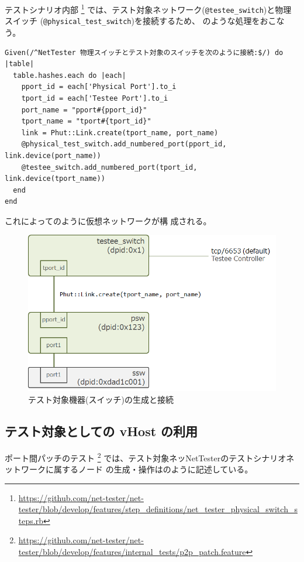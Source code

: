 テストシナリオ内部
\footnote{\url{https://github.com/net-tester/net-tester/blob/develop/features/step_definitions/net_tester_physical_switch_steps.rb}}
では、テスト対象ネットワーク(\verb|@testee_switch|)と物理スイッチ
(\verb|@physical_test_switch|)を接続するため、
のような処理をおこなう。

\begin{lstlisting}[caption=vSwitch間接続,label=lst:connect-vswitch]
Given(/^NetTester 物理スイッチとテスト対象のスイッチを次のように接続:$/) do |table|
  table.hashes.each do |each|
    pport_id = each['Physical Port'].to_i
    tport_id = each['Testee Port'].to_i
    port_name = "pport#{pport_id}"
    tport_name = "tport#{tport_id}"
    link = Phut::Link.create(tport_name, port_name)
    @physical_test_switch.add_numbered_port(pport_id, link.device(port_name))
    @testee_switch.add_numbered_port(tport_id, link.device(tport_name))
  end
end
\end{lstlisting}

これによってのように仮想ネットワークが構
成される。

\begin{figure}[h]
 \centering
 \includegraphics[scale=0.6]{img/phut-testee-switch.png}
 \caption{テスト対象機器(スイッチ)の生成と接続}
 \label{fig:phut-testee-switch}
\end{figure}

\subsection{テスト対象としての vHost の利用}

ポート間パッチのテスト
\footnote{\url{https://github.com/net-tester/net-tester/blob/develop/features/internal_tests/p2p_patch.feature}}
では、テスト対象ネッNetTesterのテストシナリオネットワークに属するノード
の生成・操作はのように記述している。

